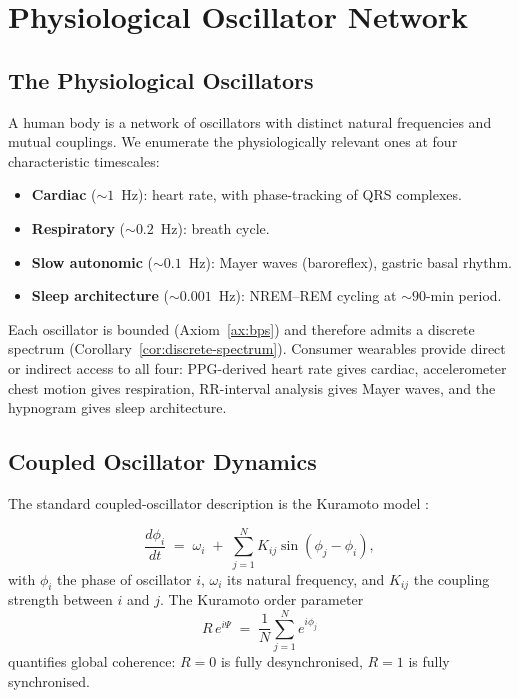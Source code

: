 \documentclass[11pt,twocolumn,a4paper]{article}
\theoremstyle{definition}
\theoremstyle{remark}
\newcommand{\Rcoh}{R}
\newcommand{\Korder}{K}
\begin{document}
\section{Physiological Oscillator Network}
\label{sec:coherence-derivation}

\subsection{The Physiological Oscillators}

A human body is a network of oscillators with distinct natural
frequencies and mutual couplings. We enumerate the physiologically
relevant ones at four characteristic timescales:

\begin{itemize}[leftmargin=*]
\item \textbf{Cardiac} ($\sim 1$~Hz): heart rate, with phase-tracking
of QRS complexes.
\item \textbf{Respiratory} ($\sim 0.2$~Hz): breath cycle.
\item \textbf{Slow autonomic} ($\sim 0.1$~Hz): Mayer waves
(baroreflex), gastric basal rhythm.
\item \textbf{Sleep architecture} ($\sim 0.001$~Hz): NREM--REM
cycling at $\sim 90$-min period.
\end{itemize}

Each oscillator is bounded (Axiom~\ref{ax:bps}) and therefore
admits a discrete spectrum (Corollary~\ref{cor:discrete-spectrum}).
Consumer wearables provide direct or indirect access to all four:
PPG-derived heart rate gives cardiac, accelerometer chest motion
gives respiration, RR-interval analysis gives Mayer waves, and the
hypnogram gives sleep architecture.

\subsection{Coupled Oscillator Dynamics}

The standard coupled-oscillator description is the Kuramoto model
\citep{kuramoto1984, strogatz2000, acebron2005}:

\begin{equation}
\frac{d\phi_i}{dt} \;=\; \omega_i \;+\; \sum_{j=1}^{N} \Korder_{ij} \sin(\phi_j - \phi_i),
\label{eq:kuramoto}
\end{equation}
with $\phi_i$ the phase of oscillator $i$, $\omega_i$ its natural
frequency, and $\Korder_{ij}$ the coupling strength between $i$ and
$j$. The Kuramoto order parameter
\begin{equation}
\Rcoh \, e^{i \Psi} \;=\; \frac{1}{N} \sum_{j=1}^{N} e^{i \phi_j}
\label{eq:order}
\end{equation}
quantifies global coherence: $\Rcoh = 0$ is fully desynchronised,
$\Rcoh = 1$ is fully synchronised.
\end{document}
